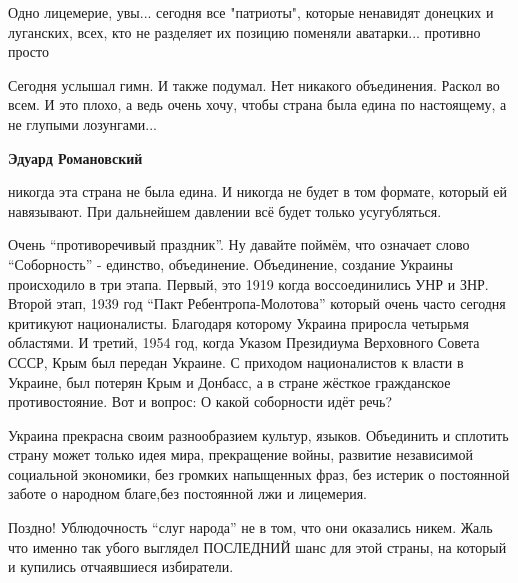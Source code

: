  
 
 
 
 
\zzSecCmt

\begin{itemize} %

Одно лицемерие, увы... сегодня все "патриоты", которые ненавидят донецких и
луганских, всех, кто не разделяет их позицию поменяли аватарки... противно просто


Сегодня услышал гимн. И также подумал. Нет никакого объединения. Раскол во
всем. И это плохо, а ведь очень хочу, чтобы страна была едина по настоящему, а
не глупыми лозунгами...

\textbf{Эдуард Романовский} 

никогда эта страна не была едина. И никогда не будет в том формате, который ей
навязывают. При дальнейшем давлении всё будет только усугубляться.


Очень \enquote{противоречивый праздник}. Ну давайте поймём, что означает слово
\enquote{Соборность} - единство, объединение. Объединение, создание Украины происходило
в три этапа. Первый, это 1919 когда воссоединились УНР и ЗНР. Второй этап, 1939
год \enquote{Пакт Ребентропа-Молотова} который очень часто сегодня критикуют
националисты. Благодаря которому Украина приросла четырьмя областями. И третий,
1954 год, когда Указом Президиума Верховного Совета СССР, Крым был передан
Украине. С приходом националистов к власти в Украине, был потерян Крым и
Донбасс, а в стране жёсткое гражданское противостояние. Вот и вопрос: О какой
соборности идёт речь?


Украина прекрасна своим разнообразием культур, языков. Объединить и сплотить
страну может только идея мира, прекращение войны, развитие независимой
социальной экономики, без громких напыщенных фраз, без истерик о постоянной
заботе о народном благе,без постоянной лжи и лицемерия.



Поздно! Ублюдочность \enquote{слуг народа} не в том, что они оказались никем. Жаль что
именно так убого выглядел ПОСЛЕДНИЙ шанс для этой страны, на который и купились
отчаявшиеся избиратели.


\end{itemize}
